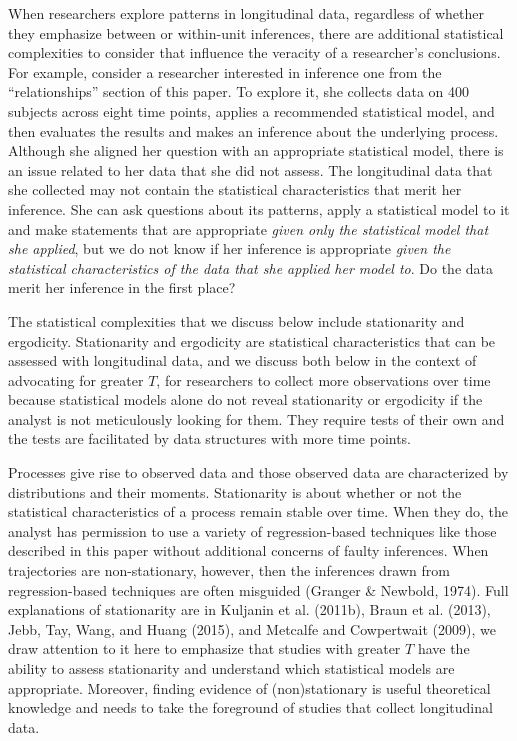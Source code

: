 \documentclass[english,,man]{apa6}
\theoremstyle{definition}
\theoremstyle{definition}
\theoremstyle{definition}
\theoremstyle{remark}
\begin{document}
When researchers explore patterns in longitudinal data, regardless of
whether they emphasize between or within-unit inferences, there are
additional statistical complexities to consider that influence the
veracity of a researcher's conclusions. For example, consider a
researcher interested in inference one from the \enquote{relationships}
section of this paper. To explore it, she collects data on 400 subjects
across eight time points, applies a recommended statistical model, and
then evaluates the results and makes an inference about the underlying
process. Although she aligned her question with an appropriate
statistical model, there is an issue related to her data that she did
not assess. The longitudinal data that she collected may not contain the
statistical characteristics that merit her inference. She can ask
questions about its patterns, apply a statistical model to it and make
statements that are appropriate \emph{given only the statistical model
that she applied}, but we do not know if her inference is appropriate
\emph{given the statistical characteristics of the data that she applied
her model to}. Do the data merit her inference in the first place?

The statistical complexities that we discuss below include stationarity
and ergodicity. Stationarity and ergodicity are statistical
characteristics that can be assessed with longitudinal data, and we
discuss both below in the context of advocating for greater \(T\), for
researchers to collect more observations over time because statistical
models alone do not reveal stationarity or ergodicity if the analyst is
not meticulously looking for them. They require tests of their own and
the tests are facilitated by data structures with more time points.

Processes give rise to observed data and those observed data are
characterized by distributions and their moments. Stationarity is about
whether or not the statistical characteristics of a process remain
stable over time. When they do, the analyst has permission to use a
variety of regression-based techniques like those described in this
paper without additional concerns of faulty inferences. When
trajectories are non-stationary, however, then the inferences drawn from
regression-based techniques are often misguided (Granger \& Newbold,
1974). Full explanations of stationarity are in Kuljanin et al. (2011b),
Braun et al. (2013), Jebb, Tay, Wang, and Huang (2015), and Metcalfe and
Cowpertwait (2009), we draw attention to it here to emphasize that
studies with greater \(T\) have the ability to assess stationarity and
understand which statistical models are appropriate. Moreover, finding
evidence of (non)stationary is useful theoretical knowledge and needs to
take the foreground of studies that collect longitudinal data.
\end{document}
